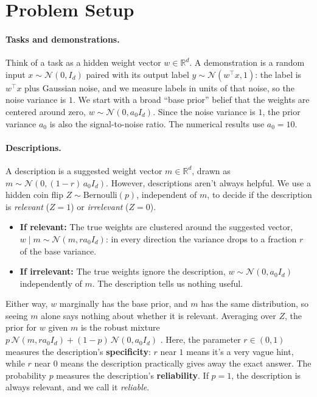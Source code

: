 \documentclass{article}
\newcommand{\R}{\mathbb{R}}
\begin{document}
\section{Problem Setup}\label{sec:setting}

\paragraph{Tasks and demonstrations.}
Think of a task as a hidden weight vector $w \in \R^d$. A demonstration is a random input $x \sim \mathcal{N}(0, I_d)$ paired with its output label $y \sim \mathcal{N}(w^\top x, 1)$: the label is $w^\top x$ plus Gaussian noise, and we measure labels in units of that noise, so the noise variance is $1$. We start with a broad ``base prior'' belief that the weights are centered around zero, $w \sim \mathcal{N}(0, a_0 I_d)$. Since the noise variance is $1$, the prior variance $a_0$ is also the signal-to-noise ratio. The numerical results use $a_0 = 10$.

\paragraph{Descriptions.}
A description is a suggested weight vector $m \in \R^d$, drawn as $m \sim \mathcal{N}(0, (1-r)\,a_0 I_d)$. However, descriptions aren't always helpful. We use a hidden coin flip $Z \sim \mathrm{Bernoulli}(p)$, independent of $m$, to decide if the description is \emph{relevant} ($Z=1$) or \emph{irrelevant} ($Z=0$).
\begin{itemize}
    \item \textbf{If relevant:} The true weights are clustered around the suggested vector, $w \mid m \sim \mathcal{N}(m, r a_0 I_d)$: in every direction the variance drops to a fraction $r$ of the base variance.
    \item \textbf{If irrelevant:} The true weights ignore the description, $w \sim \mathcal{N}(0, a_0 I_d)$ independently of $m$. The description tells us nothing useful.
\end{itemize}
Either way, $w$ marginally has the base prior, and $m$ has the same distribution, so seeing $m$ alone says nothing about whether it is relevant. Averaging over $Z$, the prior for $w$ given $m$ is the robust mixture $p\,\mathcal{N}(m, r a_0 I_d) + (1-p)\,\mathcal{N}(0, a_0 I_d)$ \citep{schmidli2014}. Here, the parameter $r \in (0,1)$ measures the description's \textbf{specificity}: $r$ near $1$ means it's a very vague hint, while $r$ near $0$ means the description practically gives away the exact answer. The probability $p$ measures the description's \textbf{reliability}. If $p=1$, the description is always relevant, and we call it \emph{reliable}.
\end{document}
